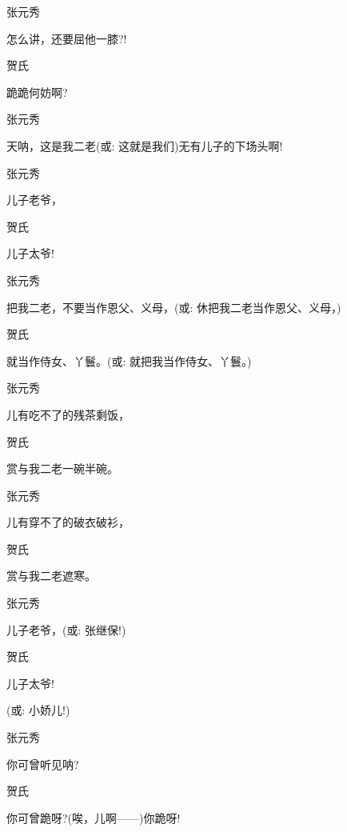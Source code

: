 张元秀\hspace{20pt}~

怎么讲，还要屈他一膝?!

贺氏\hspace{30pt}~

跪跪何妨啊?

张元秀\hspace{20pt}~

天呐，这是我二老({\akai 或}: 这就是我们)无有儿子的下场头啊!

张元秀\hspace{20pt}~

儿子老爷，

贺氏\hspace{30pt}~

儿子太爷!

张元秀\hspace{20pt}~

把我二老，不要当作恩父、义母，({\akai 或}: 休把我二老当作恩父、义母，)

贺氏\hspace{30pt}~

就当作侍女、丫鬟。({\akai 或}: 就把我当作侍女、丫鬟。)

张元秀\hspace{20pt}~

儿有吃不了的残茶剩饭，

贺氏\hspace{30pt}~

赏与我二老一碗半碗。

张元秀\hspace{20pt}~

儿有穿不了的破衣破衫，

贺氏\hspace{30pt}~

赏与我二老遮寒。

张元秀\hspace{20pt}~

儿子老爷，({\akai 或}: 张继保!)

贺氏\hspace{30pt}~

儿子太爷!

({\akai 或}: 小娇儿!)

张元秀\hspace{20pt}~

你可曾听见呐?

贺氏\hspace{30pt}~

你可曾跪呀?(唉，儿啊------)你跪呀!

